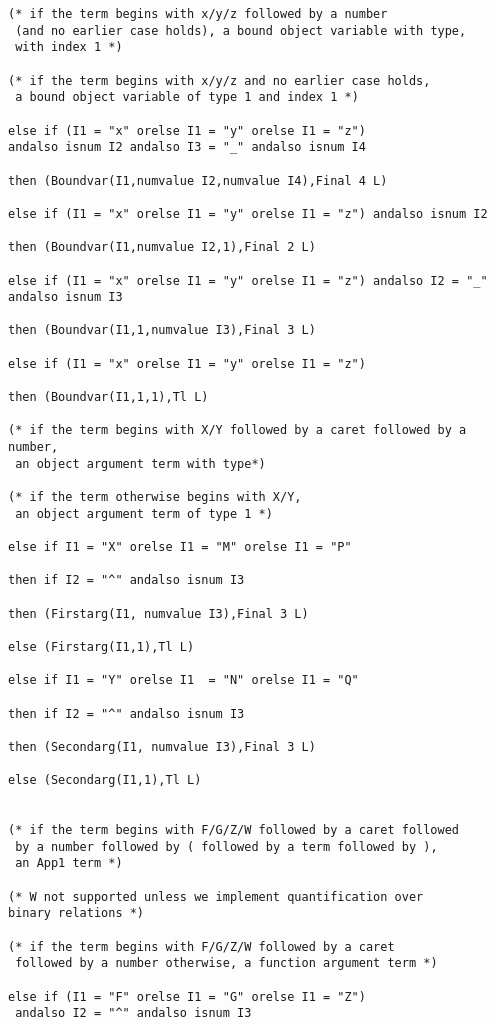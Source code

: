 \documentclass{article}
\begin{document}
{{\begin{verbatim}
(* if the term begins with x/y/z followed by a number
 (and no earlier case holds), a bound object variable with type,
 with index 1 *)

(* if the term begins with x/y/z and no earlier case holds,
 a bound object variable of type 1 and index 1 *)

else if (I1 = "x" orelse I1 = "y" orelse I1 = "z") 
andalso isnum I2 andalso I3 = "_" andalso isnum I4

then (Boundvar(I1,numvalue I2,numvalue I4),Final 4 L)

else if (I1 = "x" orelse I1 = "y" orelse I1 = "z") andalso isnum I2

then (Boundvar(I1,numvalue I2,1),Final 2 L)

else if (I1 = "x" orelse I1 = "y" orelse I1 = "z") andalso I2 = "_" andalso isnum I3

then (Boundvar(I1,1,numvalue I3),Final 3 L)

else if (I1 = "x" orelse I1 = "y" orelse I1 = "z")

then (Boundvar(I1,1,1),Tl L)

(* if the term begins with X/Y followed by a caret followed by a number,
 an object argument term with type*)

(* if the term otherwise begins with X/Y,
 an object argument term of type 1 *)

else if I1 = "X" orelse I1 = "M" orelse I1 = "P"

then if I2 = "^" andalso isnum I3

then (Firstarg(I1, numvalue I3),Final 3 L)

else (Firstarg(I1,1),Tl L)

else if I1 = "Y" orelse I1  = "N" orelse I1 = "Q"

then if I2 = "^" andalso isnum I3

then (Secondarg(I1, numvalue I3),Final 3 L)

else (Secondarg(I1,1),Tl L)


(* if the term begins with F/G/Z/W followed by a caret followed
 by a number followed by ( followed by a term followed by ),
 an App1 term *)

(* W not supported unless we implement quantification over
binary relations *)

(* if the term begins with F/G/Z/W followed by a caret
 followed by a number otherwise, a function argument term *)

else if (I1 = "F" orelse I1 = "G" orelse I1 = "Z")
 andalso I2 = "^" andalso isnum I3 


\end{verbatim}}}
\end{document}
